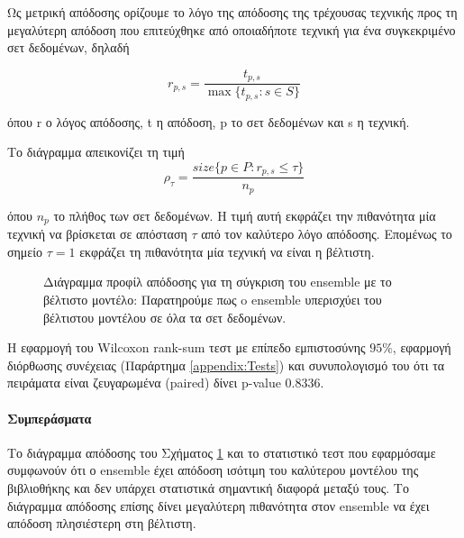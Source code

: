 Ως μετρική απόδοσης ορίζουμε το λόγο της απόδοσης της τρέχουσας τεχνικής προς τη μεγαλύτερη απόδοση που επιτεύχθηκε από οποιαδήποτε τεχνική για ένα συγκεκριμένο σετ δεδομένων, δηλαδή

\begin{equation}
r_{p,s}= \frac{t_{p,s}}{\max\{{t_{p,s} : s \in S}\}}    
\end{equation} 

όπου r ο λόγος απόδοσης, t η απόδοση, p το σετ δεδομένων και s η τεχνική.

Το διάγραμμα απεικονίζει τη τιμή
\begin{equation}
\rho_{\tau}= \frac{size\{{p \in P : r_{p,s} \leq \tau  }\}}{n_p}   
\end{equation}

όπου $n_p$ το πλήθος των σετ δεδομένων. Η τιμή αυτή εκφράζει την πιθανότητα μία τεχνική να βρίσκεται σε απόσταση $\tau$ από τον καλύτερο λόγο απόδοσης.  Επομένως το σημείο $\tau = 1$ εκφράζει τη πιθανότητα μία τεχνική να είναι η βέλτιστη.

\begin{figure}[!htb]
	\scalebox{0.8}{
	}
		\caption[Διάγραμμα προφίλ απόδοσης για τη σύγκριση του ensemble με το βέλτιστο μοντέλο]{Διάγραμμα προφίλ απόδοσης για τη σύγκριση του ensemble με το βέλτιστο μοντέλο: Παρατηρούμε πως o ensemble υπερισχύει του βέλτιστου μοντέλου σε όλα τα σετ δεδομένων. }
		\label{fig:ensprof}
\end{figure}

Η εφαρμογή του Wilcoxon rank-sum τεστ με επίπεδο εμπιστοσύνης $95\%$, εφαρμογή διόρθωσης συνέχειας (Παράρτημα \ref{appendix:Tests}) και συνυπολογισμό του ότι τα πειράματα είναι ζευγαρωμένα (paired) δίνει p-value 0.8336.  

\paragraph{Συμπεράσματα}
Το διάγραμμα απόδοσης του Σχήματος \ref{fig:ensprof} και το στατιστικό τεστ που εφαρμόσαμε συμφωνούν ότι ο ensemble έχει απόδοση ισότιμη του καλύτερου μοντέλου της βιβλιοθήκης και δεν υπάρχει στατιστικά σημαντική διαφορά μεταξύ τους. Το διάγραμμα απόδοσης επίσης δίνει μεγαλύτερη πιθανότητα στον ensemble να έχει απόδοση πλησιέστερη στη βέλτιστη.
 
